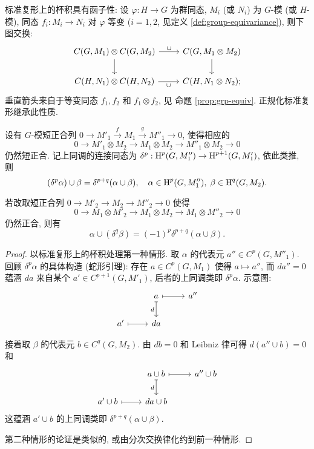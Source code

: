 标准复形上的杯积具有函子性: 设 $\varphi: H \to G$ 为群同态, $M_i$ (或 $N_i$) 为 $G$-模 (或 $H$-模), 同态 $f_i: M_i \to N_i$ 对 $\varphi$ 等变 ($i=1,2$, 见定义 \ref{def:group-equivariance}), 则下图交换:
\[\begin{tikzcd}
	C(G, M_1) \otimes C(G, M_2) \arrow[r, "\cup"] \arrow[d] & C(G, M_1 \otimes M_2) \arrow[d] \\
	C(H, N_1) \otimes C(H, N_2) \arrow[r, "\cup"'] & C(H, N_1 \otimes N_2);
\end{tikzcd}\]
垂直箭头来自于等变同态 $f_1, f_2$ 和 $f_1 \otimes f_2$, 见 命题 \ref{prop:grp-equiv}. 正规化标准复形继承此性质.

\begin{corollary}\label{prop:cup-ses}
	设有 $G$-模短正合列 $0 \to M'_1 \xrightarrow{f} M_1 \xrightarrow{g} M''_1 \to 0$, 使得相应的
	\[ 0 \to M'_1 \otimes M_2 \to M_1 \otimes M_2 \to M''_1 \otimes M_2 \to 0 \]
	仍然短正合. 记上同调的连接同态为 $\delta^p: \operatorname{H}^p(G, M''_1) \to \operatorname{H}^{p+1}(G, M'_1)$, 依此类推, 则
	\[ (\delta^p \alpha) \cup \beta = \delta^{p+q}(\alpha \cup \beta), \quad \alpha \in \operatorname{H}^p(G, M''_1), \; \beta \in \operatorname{H}^q(G, M_2). \]

	若改取短正合列 $0 \to M'_2 \to M_2 \to M''_2 \to 0$ 使得
	\[ 0 \to M_1 \otimes M'_2 \to M_1 \otimes M_2 \to M_1 \otimes M''_2 \to 0 \]
	仍然正合, 则有
	\[ \alpha \cup (\delta^q \beta) = (-1)^p \delta^{p+q} (\alpha \cup \beta). \]
\end{corollary}
\begin{proof}
	以标准复形上的杯积处理第一种情形. 取 $\alpha$ 的代表元 $a'' \in C^p(G, M''_1)$. 回顾 $\delta^p \alpha$ 的具体构造 (蛇形引理): 存在 $a \in C^p(G, M_1)$ 使得 $a \mapsto a''$, 而 $da'' = 0$ 蕴涵 $da$ 来自某个 $a' \in C^{p+1}(G, M'_1)$, 后者的上同调类即 $\delta^p \alpha$. 示意图:
	\[\begin{tikzcd}
		& a \arrow[mapsto, r] \arrow[mapsto, d, "d"'] & a'' \\
		a' \arrow[mapsto, r] & da &
	\end{tikzcd}\]
	
	接着取 $\beta$ 的代表元 $b \in C^q(G, M_2)$. 由 $db = 0$ 和 Leibniz 律可得 $d(a'' \cup b) = 0$ 和
	\[\begin{tikzcd}
		& a \cup b \arrow[mapsto, r] \arrow[mapsto, d, "d"'] & a'' \cup b \\
		a' \cup b \arrow[mapsto, r] & da \cup b &
	\end{tikzcd}\]
	这蕴涵 $a' \cup b$ 的上同调类即 $\delta^{p+q}(\alpha \cup \beta)$.
	
	第二种情形的论证是类似的, 或由分次交换律化约到前一种情形.
\end{proof}	

